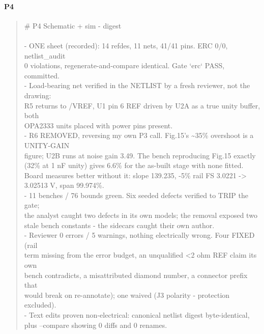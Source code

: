 \documentclass[11pt,a4paper]{article}
\begin{document}
\paragraph*{P4}
\begin{quote}\small\ttfamily\raggedright
\# P4 Schematic + sim - digest\\
~\\
- ONE sheet (recorded): 14 refdes, 11 nets, 41/41 pins. ERC 0/0, netlist\_audit\\
  0 violations, regenerate-and-compare identical. Gate `erc` PASS, committed.\\
- Load-bearing net verified in the NETLIST by a fresh reviewer, not the drawing:\\
  R5 returns to /VREF, U1 pin 6 REF driven by U2A as a true unity buffer, both\\
  OPA2333 units placed with power pins present.\\
- R6 REMOVED, reversing my own P3 call. Fig.15's \textasciitilde{}35\% overshoot is a UNITY-GAIN\\
  figure; U2B runs at noise gain 3.49. The bench reproducing Fig.15 exactly\\
  (32\% at 1 nF unity) gives 6.6\% for the as-built stage with none fitted.\\
  Board measures better without it: slope 139.235, -5\% rail FS 3.0221 -\textgreater{}\\
  3.02513 V, span 99.974\%.\\
- 11 benches / 76 bounds green. Six seeded defects verified to TRIP the gate;\\
  the analyst caught two defects in its own models; the removal exposed two\\
  stale bench constants - the sidecars caught their own author.\\
- Reviewer 0 errors / 5 warnings, nothing electrically wrong. Four FIXED (rail\\
  term missing from the error budget, an unqualified \textless{}2 ohm REF claim its own\\
  bench contradicts, a misattributed diamond number, a connector prefix that\\
  would break on re-annotate); one waived (J3 polarity - protection excluded).\\
- Text edits proven non-electrical: canonical netlist digest byte-identical,\\
  plus --compare showing 0 diffs and 0 renames.
\end{quote}
\end{document}
